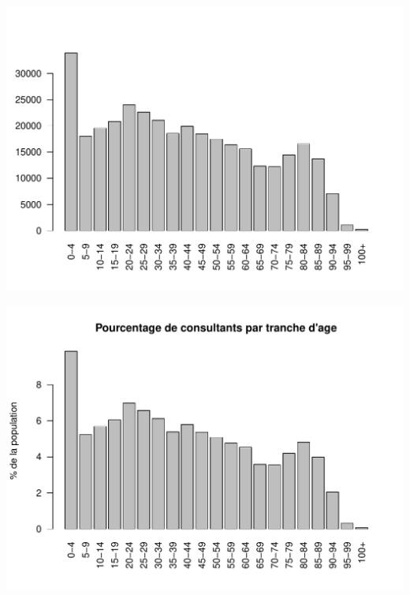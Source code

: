 \documentclass[12pt,english,french,twoside]{book}\usepackage[]{graphicx}\usepackage[]{color}
\makeatletter
\def\maxwidth{ %
  \ifdim\Gin@nat@width>\linewidth
    \linewidth
  \else
    \Gin@nat@width
  \fi
}
\newenvironment{knitrout}{}{} %
\makeatother
\begin{document}




\begin{center}
\begin{knitrout}
\color{fgcolor}
\includegraphics[width=\maxwidth]{figure/affiche_age31} 

\includegraphics[width=\maxwidth]{figure/affiche_age32} 

\end{knitrout}

\end{center}
\label{fig:tranches_age3}
\end{document}
